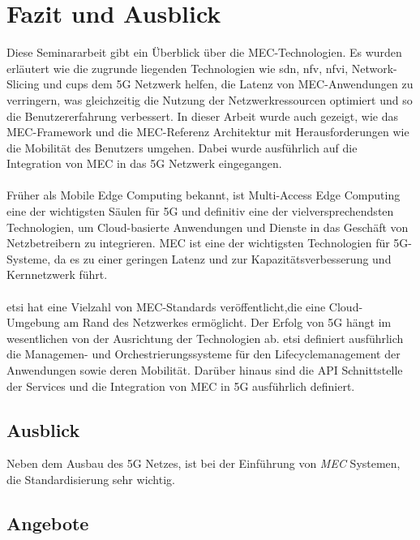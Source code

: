 \documentclass[runningheads]{llncs}
\numberwithin{figure}{section}
\begin{document}
\newpage

\section{Fazit und Ausblick}
Diese Seminararbeit gibt ein Überblick über die MEC-Technologien. Es wurden erläutert wie die 
zugrunde liegenden
Technologien wie \acrshort{sdn}, \acrshort{nfv}, \acrshort{nfvi}, Network-Slicing und \acrshort{cups}
dem 5G Netzwerk helfen, die Latenz von MEC-Anwendungen zu verringern, was gleichzeitig die Nutzung der
Netzwerkressourcen optimiert und so die Benutzererfahrung verbessert. In dieser Arbeit wurde auch gezeigt, 
wie das MEC-Framework und die MEC-Referenz Architektur mit Herausforderungen wie die Mobilität des Benutzers
umgehen. Dabei wurde ausführlich auf die Integration von MEC in das 5G Netzwerk eingegangen.
\\
\\
Früher als Mobile Edge Computing bekannt, ist Multi-Access Edge Computing eine der 
wichtigsten Säulen für 5G und  definitiv eine der vielversprechendsten Technologien, 
um Cloud-basierte Anwendungen und Dienste in das Geschäft von Netzbetreibern zu integrieren.
MEC ist eine der wichtigsten Technologien für 5G-Systeme, 
da es zu einer geringen Latenz und zur Kapazitätsverbesserung und Kernnetzwerk führt. 
\\
\\
\acrlong{etsi} hat eine Vielzahl von MEC-Standards veröffentlicht,die eine Cloud-Umgebung am Rand des 
Netzwerkes ermöglicht. Der Erfolg von 5G hängt im wesentlichen von der Ausrichtung der Technologien ab.
\acrshort{etsi} definiert ausführlich die Managemen- und Orchestrierungssysteme für den Lifecyclemanagement der 
Anwendungen sowie deren Mobilität. Darüber hinaus sind die API Schnittstelle der Services und die Integration
von MEC in 5G ausführlich definiert. 

\subsection{Ausblick}
Neben dem Ausbau des 5G Netzes, ist bei der Einführung von \textit{MEC} Systemen, 
die Standardisierung sehr wichtig.  \cite{abdullahSegmentRoutingSoftware21}
\subsection{Angebote}
\label{subsec:Angebote}
\label{sec:Ausblick}


\newpage
%
\printbibliography[heading=bibintoc]
\end{document}
